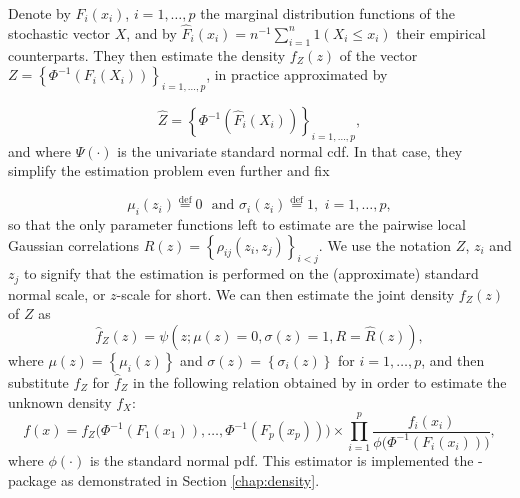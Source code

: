Denote by $F_i\left(x_i\right)$, $i = 1,\ldots, p$ the marginal distribution functions of the stochastic vector $X$, and by $\widehat F_i\left(x_i\right) = n^{-1}\sum_{i=1}^n 1\left(X_i \leq x_i\right)$ their empirical counterparts. They then estimate the density $f_Z\left(z\right)$ of the vector $Z = \left\{\Phi^{-1}\left(F_i\left(X_i\right)\right)\right\}_{i=1,\ldots,p}$, in practice approximated by 

\begin{equation}
\widehat Z = \left\{\Phi^{-1}\left(\widehat F_i\left(X_i\right)\right)\right\}_{i=1,\ldots,p}, 
\label{eq:trans}
\end{equation}
and where $\Psi\left(\cdot\right)$ is the univariate standard normal cdf. In that case, they simplify the estimation problem even further and fix

\begin{equation}
\mu_i\left(z_i\right) \stackrel{\textrm{def}}{=} 0 \,\, \textrm{ and } \sigma_i\left(z_i\right) \stackrel{\textrm{def}}{=} 1, \,\, i = 1,\ldots,p,
\label{eq:simp}
\end{equation}
so that the only parameter functions left to estimate are the pairwise local Gaussian correlations $R\left(z\right) = \left\{\rho_{ij}\left(z_i, z_j\right)\right\}_{i<j}$. We use the notation $Z$, $z_i$ and $z_j$ to signify that the estimation is performed on the (approximate) standard normal scale, or $z$-scale for short. We can then estimate the joint density $f_Z\left(z\right)$ of $Z$ as
\begin{equation}
\widehat f_Z\left(z\right) = \psi\left(z; \mu\left(z\right) = 0, \sigma\left(z\right) = 1, R = \widehat R\left(z\right)\right),
\label{eq:transformed-density}
\end{equation}
where $\mu\left(z\right) = \left\{\mu_i\left(z\right)\right\}$ and $\sigma\left(z\right) = \left\{\sigma_i\left(z\right)\right\}$ for $i=1,\ldots,p$, and then substitute $f_Z$ for $\widehat f_Z$ in the following relation obtained by \cite{otne:tjos:2017} in order to estimate the unknown density $f_X$:
\begin{equation}
f\left(x\right) = f_{Z}\big(\Phi^{-1}\left(F_1\left(x_1\right)\right), \ldots, \Phi^{-1}\left(F_p\left(x_p\right)\right)\big) \times \prod_{i=1}^p \frac{f_i\left(x_i\right)}{\phi\big(\Phi^{-1}\left(F_i\left(x_i\right)\right)\big)},
\label{eq:backtrans}
\end{equation}
where $\phi\left(\cdot\right)$ is the standard normal pdf. This estimator is implemented the -package as demonstrated in Section \ref{chap:density}.

